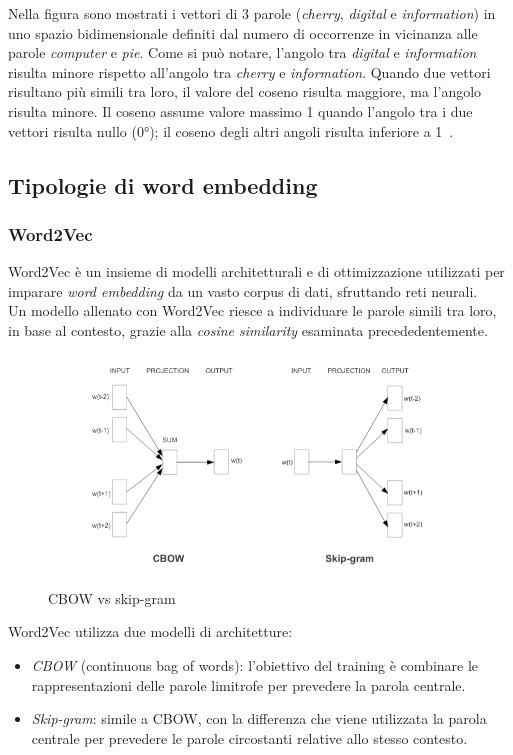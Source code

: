 Nella figura sono mostrati i vettori di 3 parole (\textit{cherry}, \textit{digital} e \textit{information}) in uno spazio bidimensionale definiti dal numero di occorrenze in vicinanza alle parole \textit{computer} e \textit{pie}.
Come si può notare, l'angolo tra \textit{digital} e \textit{information} risulta minore rispetto all'angolo tra \textit{cherry} e \textit{information}.
Quando due vettori risultano più simili tra loro, il valore del coseno risulta maggiore, ma l'angolo risulta minore. Il coseno assume valore massimo 1 quando l'angolo tra i due vettori risulta nullo (0°); il coseno degli altri angoli risulta inferiore a 1~\cite{cosine}.
\subsection{Tipologie di word embedding}

\subsubsection{Word2Vec}

Word2Vec è un insieme di modelli architetturali e di ottimizzazione utilizzati per imparare \emph{word embedding} da un vasto corpus di dati, sfruttando reti neurali.
\\
Un modello allenato con Word2Vec riesce a individuare le parole simili tra loro, in base al contesto, grazie alla \textit{cosine similarity} esaminata precededentemente.

\begin{figure}[h]
    \centering
    \includegraphics[width=15cm]{./immagini/cbow_vs_skipgram.png}
    \label{cbowskipgram}
    \caption{CBOW vs skip-gram~\cite{mikolov2013efficient}}
\end{figure}
\newpage
Word2Vec utilizza due modelli di architetture:
\begin{itemize}
    \item \emph{CBOW} (continuous bag of words): l'obiettivo del training è combinare le rappresentazioni delle parole limitrofe per prevedere la parola centrale.
    \item \emph{Skip-gram}: simile a CBOW, con la differenza che viene utilizzata la parola centrale per prevedere le parole circostanti relative allo stesso contesto.
\end{itemize}

